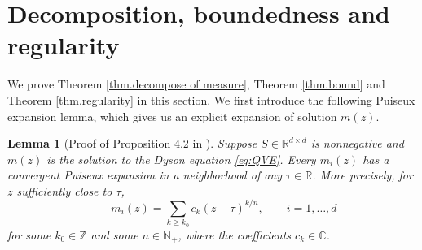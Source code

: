 \documentclass[11pt,twoside, a4paper]{article}
\numberwithin{equation}{section}
\numberwithin{figure}{section}
\theoremstyle{plain} %
\newtheorem{lemma}[theorem]{Lemma}
\theoremstyle{definition}
\theoremstyle{remark}
\newcommand{\1} {\mspace{1 mu}}
\newcommand{\2} {\mspace{2 mu}}
\newcommand{\R} {\mathbb{R}}
\newcommand{\N} {{\mathbb{N}}}
\begin{document}
\section{Decomposition, boundedness and regularity}\label{sec.decomposition}

We prove Theorem \ref{thm.decompose of measure}, Theorem \ref{thm.bound} and Theorem \ref{thm.regularity} in this section. We first introduce the following Puiseux expansion lemma, which gives us an explicit expansion of solution $m(z)$.

\begin{lemma}[Proof of Proposition 4.2 in \cite{AnantharamanSabri2019}]\label{lem:puiseux}
  Suppose $S\in\R^{d\times d}$ is nonnegative and $m(z)$ is the solution to the Dyson equation \eqref{eq:QVE}. Every $m_i(z)$ has a convergent \emph{Puiseux expansion} in a neighborhood of any $\tau\in\R$. More precisely, for $z$ sufficiently close to $\tau$,
  \begin{equation}
    \qquad m_i(z)=\sum_{k\ge k_0} c_k(z-\tau)^{k/n},\qquad i=1,\dots, d
  \end{equation}
  for some $k_0\in\mathbb Z$ and some $n\in\N_+$, where the coefficients \(c_k\in\mathbb C\).
\end{lemma}
\end{document}

